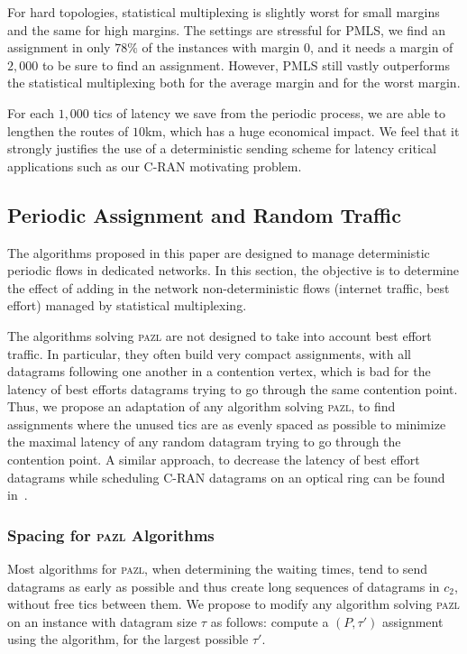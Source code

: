 \documentclass[a4paper,10pt]{article}
\newcommand\pazl{\textsc{pazl}\xspace}
\begin{document}
    For hard topologies, statistical multiplexing is slightly worst for small margins and  the same for high margins. The settings are stressful for PMLS, we find an assignment in only $78\%$ of the instances with margin $0$, and it needs a margin of $2,000$ to be sure to find an assignment. However, PMLS still vastly outperforms the statistical multiplexing both for the average margin and for the worst margin. 
    
    For each $1,000$ tics of latency we save from the periodic process, we are able to lengthen the routes of $10$km, which has a huge economical impact. We feel that it strongly justifies the use of a deterministic sending scheme for latency critical applications such as our C-RAN motivating problem.    
     
    \subsection{Periodic Assignment and Random Traffic}
    
    The algorithms proposed in this paper are designed to manage deterministic periodic flows in dedicated networks. In this section, the objective is to determine the effect of adding in the network non-deterministic flows (internet traffic, best effort) managed by statistical multiplexing.

    The algorithms solving \pazl are not designed to take into account best effort traffic. In particular, they often build very compact assignments, with all datagrams following one another in a contention vertex, which is bad for the latency of best efforts datagrams trying to go through the same contention point. Thus, we propose an adaptation of any algorithm solving \pazl, to find assignments where the unused tics are as evenly spaced as possible to minimize the maximal latency of any random datagram trying to go through the contention point. A similar approach, to decrease the latency of best effort datagrams while scheduling C-RAN datagrams on an optical ring can be found in~\cite{DBLP:conf/ondm/BarthGS19}.
    
    
    \subsubsection{Spacing for \pazl Algorithms}

    Most algorithms for \pazl, when determining the waiting times, tend to send datagrams as early as possible
    and thus create long sequences of datagrams in $c_2$, without free tics between them. We propose to modify any algorithm solving \pazl on an instance with datagram size $\tau$ as follows: compute a $(P,\tau')$ assignment using the algorithm, for the largest possible $\tau'$. 
\end{document}
